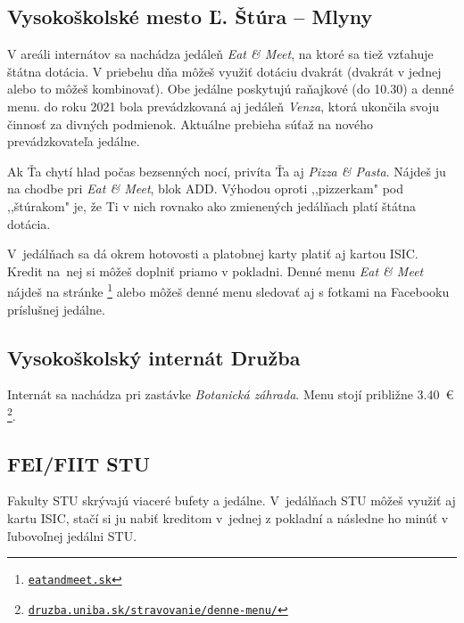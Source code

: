\subsection*{Vysokoškolské mesto Ľ. Štúra -- Mlyny}

V areáli internátov sa nachádza jedáleň \emph{Eat \& Meet}, na ktoré sa tiež vzťahuje štátna dotácia. V priebehu dňa môžeš využiť dotáciu dvakrát (dvakrát v jednej alebo to môžeš kombinovať). Obe jedálne poskytujú raňajkové (do 10.30) a denné menu. do roku 2021 bola prevádzkovaná aj jedáleň \emph{Venza}, ktorá ukončila svoju činnosť za divných podmienok. Aktuálne prebieha súťaž na nového prevádzkovateľa jedálne.

Ak Ťa chytí hlad počas bezsenných nocí, privíta Ťa aj \emph{Pizza \& Pasta}. Nájdeš ju na chodbe pri \emph{Eat \& Meet}, blok ADD. Výhodou oproti ,,pizzerkam" pod ,,štúrakom" je, že Ti v nich rovnako ako zmienených jedálňach platí štátna dotácia. 

V~jedálňach sa dá okrem hotovosti a platobnej karty platiť aj kartou ISIC. Kredit na~nej si môžeš doplniť priamo v pokladni. Denné menu \emph{Eat \& Meet} nájdeš na stránke
\footnote{\href{http://eatandmeet.sk}{\texttt{eatandmeet.sk}}} alebo môžeš denné menu sledovať aj s fotkami na Facebooku príslušnej jedálne. 

\subsection*{Vysokoškolský internát Družba}

Internát sa nachádza pri zastávke \emph{Botanická záhrada}. Menu stojí približne 3.40~€%
\footnote{\href{https://druzba.uniba.sk/stravovanie/denne-menu/}{\texttt{druzba.uniba.sk/stravovanie/denne-menu/}}%
}. 
\subsection*{FEI/FIIT STU}

Fakulty STU skrývajú viaceré bufety a jedálne. V~jedálňach STU môžeš využiť aj kartu ISIC, stačí si ju nabiť kreditom v jednej z pokladní a následne ho minúť v ľubovoľnej jedálni STU.


